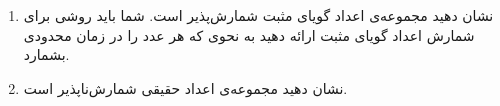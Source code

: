 \EXERCISE
\begin{enumerate}
\item
نشان دهید مجموعه‌ی اعداد گویای مثبت شمارش‌پذیر است. شما باید روشی برای شمارش اعداد گویای مثبت ارائه دهید به نحوی که هر عدد را در زمان محدودی بشمارد.
\item
نشان دهید مجموعه‌ی اعداد حقیقی شمارش‌ناپذیر است.
\end{enumerate}
